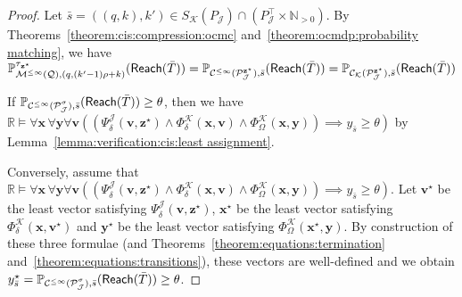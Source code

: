 \documentclass[a4paper,UKenglish,cleveref,autoref,thm-restate,colorlinks]{lipics-v2021}
\newcommand{\IR}{\mathbb{R}}
\newcommand{\IN}{\mathbb{N}}
\newcommand{\INpos}{\IN_{>0}}
\newcommand{\mdp}{\mathcal{M}}
\newcommand{\mdpStateSpace}{S}
\newcommand{\ocmdp}{\mathcal{Q}}
\newcommand{\ocmdpFin}[2]{\mdp^{\leq #2}(#1)}
\newcommand{\ocState}{q}
\newcommand{\ocCount}{k}
\newcommand{\ocCountB}{k'}
\newcommand{\ocConfig}{s}
\newcommand{\ocTrans}{\delta}
\newcommand{\period}{\rho}
\newcommand{\mchain}{\mathcal{C}}
\newcommand{\ocChain}{\mathcal{P}}
\newcommand{\ocChainFin}[2]{\mchain^{\leq #2}(#1)}
\newcommand{\intPartB}{\mathcal{J}}
\newcommand{\intPartC}{\mathcal{K}}
\newcommand{\cisChainStrat}[1]{\ocChain^{#1}_{\intPartB}}
\newcommand{\cisChain}{\cisChainStrat{\strat}}
\newcommand{\cisChainStateSpace}{P_{\intPartB}}
\newcommand{\cisChainStateSpaceStar}{P_{\intPartB}^{\top}}
\newcommand{\compressCisStateSpace}{\mdpStateSpace_{\intPartC}({\cisChainStateSpace})}
\newcommand{\cisConfig}{\bar{\ocConfig}}
\newcommand{\varTrans}{x}
\newcommand{\varTransTuple}{\mathbf{\varTrans}}
\newcommand{\solTransTuple}{\mathbf{\varTrans}^{\star}}
\newcommand{\varObj}{y}
\newcommand{\varObjTuple}{\mathbf{\varObj}}
\newcommand{\solObj}{\varObj^{\star}}
\newcommand{\solObjTuple}{\mathbf{\varObj}^{\star}}
\newcommand{\varStrat}{z}
\newcommand{\solStratTuple}{\mathbf{\varStrat}^{\star}}
\newcommand{\varCis}{v}
\newcommand{\varCisTuple}{\mathbf{\varCis}}
\newcommand{\solCisTuple}{\mathbf{\varCis}^\star}
\newcommand{\cisChainSymbSol}{\cisChainStrat{\solStratTuple}}
\newcommand{\compressCisSymbSol}{\mchain_{\intPartC}({\cisChainSymbSol})}
\newcommand{\formulaTransBase}{\Phi_{\ocTrans}}
\newcommand{\formulaObjBase}{\Phi_{\objective}}
\newcommand{\formulaCisBase}{\Psi_{\ocTrans}}
\newcommand{\formulaCis}{\formulaCisBase^\intPartB}
\newcommand{\formulaCisTrans}{\formulaTransBase^\intPartC}
\newcommand{\formulaCisObj}{\formulaObjBase^\intPartC}
\newcommand{\objective}{\Omega}
\newcommand{\reach}[1]{\mathsf{Reach}(#1)}
\newcommand{\target}{T}
\newcommand{\thresProba}{\theta}
\newcommand{\stratGeneric}[1]{{\sigma_{#1}}}
\newcommand{\strat}{\stratGeneric{}}
\newcommand{\stratBGeneric}[1]{{\tau_{#1}}}
\newcommand{\stratB}{\stratBGeneric{}}
\begin{document}
\begin{proof}
  Let $\cisConfig = ((\ocState, \ocCount), \ocCountB)\in\compressCisStateSpace\cap(\cisChainStateSpaceStar\times\INpos)$.
  By Theorems~\ref{theorem:cis:compression:ocmc} and~\ref{theorem:ocmdp:probability matching}, we have $\probaGverb{\ocmdpFin{\ocmdp}{\infty}}{(\ocState, (\ocCountB-1)\period+\ocCount)}{\stratB_{\solStratTuple}}(\reach{\bar{\target}})=\probaMCverb{\ocChainFin{\cisChainSymbSol}{\infty}}{\cisConfig}(\reach{\bar{\target}})=\probaMCverb{\compressCisSymbSol}{\cisConfig}(\reach{\bar{\target}})$

  If $\probaMCverb{\ocChainFin{\cisChain}{\infty}}{\cisConfig}(\reach{\bar{\target}})\geq\thresProba$, then we have $\IR\models\forall\varTransTuple\,\forall\varObjTuple\forall\varCisTuple ((\formulaCis(\varCisTuple, \solStratTuple)\land\formulaCisTrans(\varTransTuple,\varCisTuple)\land\formulaCisObj(\varTransTuple, \varObjTuple))\implies \varObj_{\cisConfig}\geq\thresProba)$ by Lemma~\ref{lemma:verification:cis:least assignment}.

  Conversely, assume that $\IR\models\forall\varTransTuple\,\forall\varObjTuple\forall\varCisTuple((\formulaCis(\varCisTuple, \solStratTuple)\land\formulaCisTrans(\varTransTuple,\varCisTuple)\land\formulaCisObj(\varTransTuple, \varObjTuple))\implies \varObj_{\cisConfig}\geq\thresProba)$.
  Let $\solCisTuple$ be the least vector satisfying $\formulaCis(\varCisTuple, \solStratTuple)$, $\solTransTuple$ be the least vector satisfying $\formulaCisTrans(\varTransTuple, \solCisTuple)$ and $\solObjTuple$ be the least vector satisfying $\formulaCisObj(\solTransTuple, \varObjTuple)$.
  By construction of these three formulae (and Theorems~\ref{theorem:equations:termination} and~\ref{theorem:equations:transitions}), these vectors are well-defined and we obtain $\solObj_{\cisConfig} = \probaMCverb{\ocChainFin{\cisChain}{\infty}}{\cisConfig}(\reach{\bar{\target}})\geq\thresProba$.
\end{proof}
\end{document}
